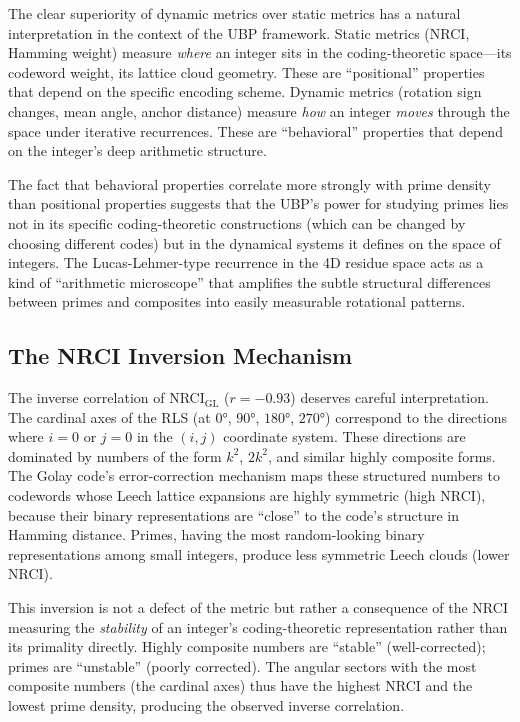 \documentclass[11pt,a4paper]{article}
\theoremstyle{definition}
\begin{document}
The clear superiority of dynamic metrics over static metrics has a natural interpretation in the context of the UBP framework. Static metrics (NRCI, Hamming weight) measure \emph{where} an integer sits in the coding-theoretic space---its codeword weight, its lattice cloud geometry. These are ``positional'' properties that depend on the specific encoding scheme. Dynamic metrics (rotation sign changes, mean angle, anchor distance) measure \emph{how} an integer \emph{moves} through the space under iterative recurrences. These are ``behavioral'' properties that depend on the integer's deep arithmetic structure.

The fact that behavioral properties correlate more strongly with prime density than positional properties suggests that the UBP's power for studying primes lies not in its specific coding-theoretic constructions (which can be changed by choosing different codes) but in the dynamical systems it defines on the space of integers. The Lucas-Lehmer-type recurrence in the 4D residue space acts as a kind of ``arithmetic microscope'' that amplifies the subtle structural differences between primes and composites into easily measurable rotational patterns.

\subsection{The NRCI Inversion Mechanism}

The inverse correlation of NRCI$_{\text{GL}}$ ($r = -0.93$) deserves careful interpretation. The cardinal axes of the RLS (at $0°$, $90°$, $180°$, $270°$) correspond to the directions where $i = 0$ or $j = 0$ in the $(i,j)$ coordinate system. These directions are dominated by numbers of the form $k^2$, $2k^2$, and similar highly composite forms. The Golay code's error-correction mechanism maps these structured numbers to codewords whose Leech lattice expansions are highly symmetric (high NRCI), because their binary representations are ``close'' to the code's structure in Hamming distance. Primes, having the most random-looking binary representations among small integers, produce less symmetric Leech clouds (lower NRCI).

This inversion is not a defect of the metric but rather a consequence of the NRCI measuring the \emph{stability} of an integer's coding-theoretic representation rather than its primality directly. Highly composite numbers are ``stable'' (well-corrected); primes are ``unstable'' (poorly corrected). The angular sectors with the most composite numbers (the cardinal axes) thus have the highest NRCI and the lowest prime density, producing the observed inverse correlation.
\end{document}
